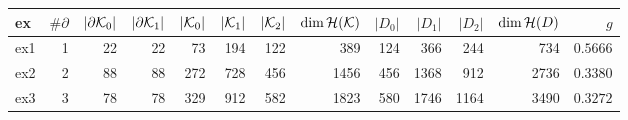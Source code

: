 \begin{tabular}{@{}lrrrrrrrrrrrr@{}}
\toprule
ex & $\#\partial$ & $|\partial\mathcal{K}_0|$ & $|\partial\mathcal{K}_1|$ & $|\mathcal{K}_0|$ & $|\mathcal{K}_1|$ & $|\mathcal{K}_2|$ & $\dim\mathcal{H}(\mathcal{K})$ & $|D_0|$ & $|D_1|$ & $|D_2|$ & $\dim\mathcal{H}(D)$ & $g$ \\
\midrule
ex1 & 1 & 22 & 22 & 73 & 194 & 122 & 389 & 124 & 366 & 244 & 734 & $0.5666$ \\
ex2 & 2 & 88 & 88 & 272 & 728 & 456 & 1456 & 456 & 1368 & 912 & 2736 & $0.3380$ \\
ex3 & 3 & 78 & 78 & 329 & 912 & 582 & 1823 & 580 & 1746 & 1164 & 3490 & $0.3272$ \\
\bottomrule
\end{tabular}
